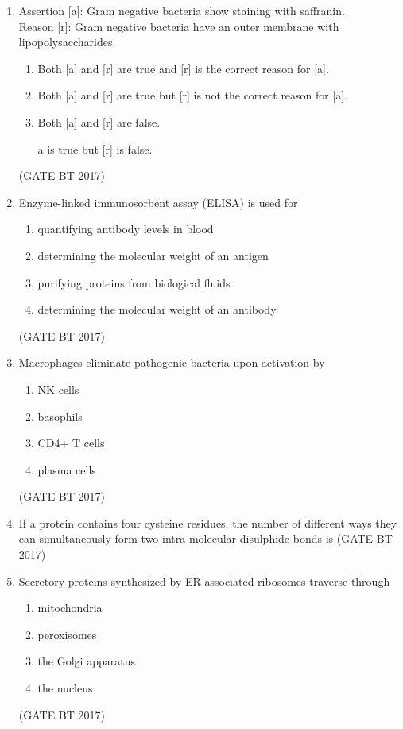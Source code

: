 \documentclass[journal,12pt,onecolumn]{IEEEtran}
\theoremstyle{remark}
\begin{document}
\begin{enumerate}
\item Assertion [a]: Gram negative bacteria show staining with saffranin. \\
Reason [r]: Gram negative bacteria have an outer membrane with lipopolysaccharides.
\begin{enumerate}
    \item Both [a] and [r] are true and [r] is the correct reason for [a].
    \item Both [a] and [r] are true but [r] is not the correct reason for [a].
    \item Both [a] and [r] are false.
    \item [a] is true but [r] is false.
\end{enumerate}
\hfill (GATE BT 2017)

\item Enzyme-linked immunosorbent assay (ELISA) is used for
\begin{enumerate}
    \item quantifying antibody levels in blood
    \item determining the molecular weight of an antigen
    \item purifying proteins from biological fluids
    \item determining the molecular weight of an antibody
\end{enumerate}
\hfill (GATE BT 2017)

\item Macrophages eliminate pathogenic bacteria upon activation by
\begin{enumerate}
    \item NK cells
    \item basophils
    \item CD4+ T cells
    \item plasma cells
\end{enumerate}
\hfill (GATE BT 2017)

\item If a protein contains four cysteine residues, the number of different ways they can simultaneously form two intra-molecular disulphide bonds is  
\hfill (GATE BT 2017)

\item Secretory proteins synthesized by ER-associated ribosomes traverse through
\begin{enumerate}
    \item mitochondria
    \item peroxisomes
    \item the Golgi apparatus
    \item the nucleus
\end{enumerate}
\hfill (GATE BT 2017)


\end{enumerate}
\end{document}
